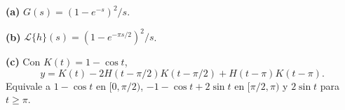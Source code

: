 \noindent\textbf{(a)} $G(s)=(1-e^{-s})^2/s$.

\noindent\textbf{(b)} $\mathcal L\{h\}(s)=(1-e^{-\pi s/2})^2/s$.

\noindent\textbf{(c)} Con $K(t)=1-\cos t$,
\[y=K(t)-2H(t-\pi/2)K(t-\pi/2)+H(t-\pi)K(t-\pi).\]
Equivale a $1-\cos t$ en $[0,\pi/2)$, $-1-\cos t+2\sin t$ en $[\pi/2,\pi)$ y $2\sin t$ para $t\ge\pi$.
